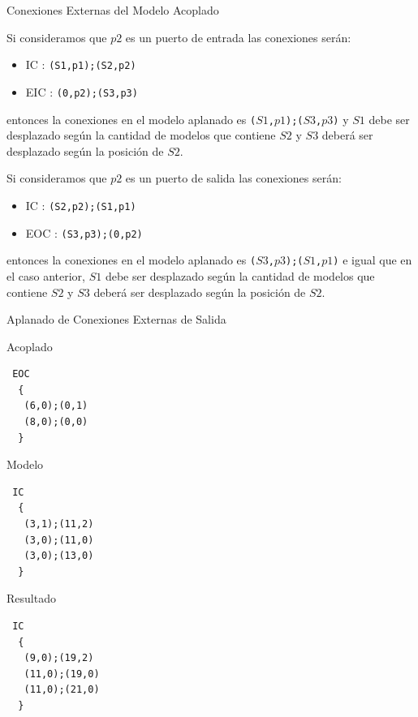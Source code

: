 \documentclass{beamer}
\begin{document}
\begin{frame}{Conexiones Externas del Modelo Acoplado}

	Si consideramos que $p2$ es un puerto de entrada las conexiones serán:

	\begin{itemize}
	\item IC : \texttt{(S1,p1);(S2,p2)}
	\item EIC : \texttt{(0,p2);(S3,p3)} 
	\end{itemize}

	entonces la conexiones en el modelo aplanado es \texttt{($S1$,$p1$);($S3$,$p3$)} y $S1$ debe ser desplazado según la cantidad de modelos que contiene $S2$ y 
	$S3$ deberá ser desplazado según la posición de $S2$.

	Si consideramos que $p2$ es un puerto de salida las conexiones serán:

	\begin{itemize}
	\item IC : \texttt{(S2,p2);(S1,p1)}
	\item EOC : \texttt{(S3,p3);(0,p2)}
	\end{itemize}

	entonces la conexiones en el modelo aplanado es \texttt{($S3$,$p3$);($S1$,$p1$)} e igual que en el caso anterior, $S1$ debe ser desplazado según la 
	cantidad de modelos que contiene $S2$ y $S3$ deberá ser desplazado según la posición de $S2$.
\end{frame}

\begin{frame}[fragile]{Aplanado de Conexiones Externas de Salida}
\begin{minipage}[t]{0.3\linewidth}
Acoplado
\begin{verbatim}
 EOC
  {
   (6,0);(0,1)
   (8,0);(0,0)
  }
\end{verbatim}
\end{minipage}
\begin{minipage}[t]{0.3\linewidth}
Modelo
\begin{verbatim}
 IC
  {
   (3,1);(11,2)
   (3,0);(11,0)
   (3,0);(13,0)
  }
\end{verbatim}
\end{minipage}
\begin{minipage}[t]{0.3\linewidth}
Resultado
\begin{verbatim}
 IC
  {
   (9,0);(19,2)
   (11,0);(19,0)
   (11,0);(21,0)
  }
\end{verbatim}
\end{minipage}
\end{frame}
\end{document}
